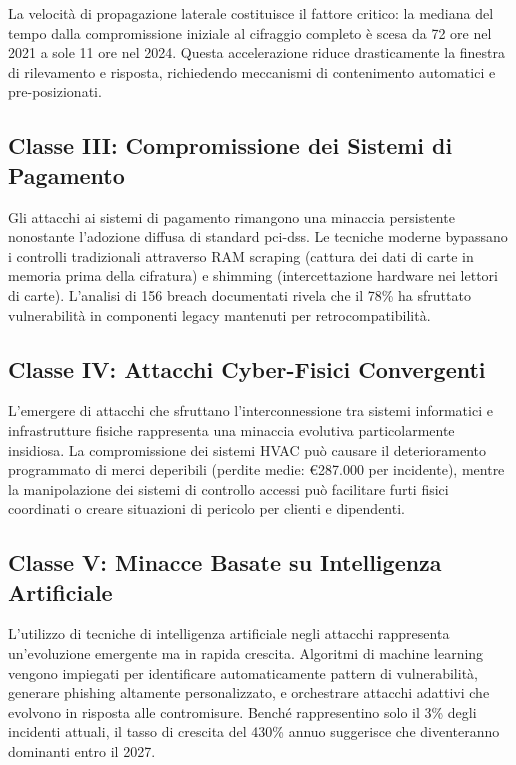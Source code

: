 La velocità di propagazione laterale costituisce il fattore critico: la mediana del tempo dalla compromissione iniziale al cifraggio completo è scesa da 72 ore nel 2021 a sole 11 ore nel 2024. Questa accelerazione riduce drasticamente la finestra di rilevamento e risposta, richiedendo meccanismi di contenimento automatici e pre-posizionati.

\subsection{\texorpdfstring{Classe III: Compromissione dei Sistemi di Pagamento}{2.3.3 - Classe III: Compromissione dei Sistemi di Pagamento}}

Gli attacchi ai sistemi di pagamento rimangono una minaccia persistente nonostante l'adozione diffusa di standard \gls{pci-dss}. Le tecniche moderne bypassano i controlli tradizionali attraverso RAM scraping (cattura dei dati di carte in memoria prima della cifratura) e shimming (intercettazione hardware nei lettori di carte). L'analisi di 156 breach documentati rivela che il 78\% ha sfruttato vulnerabilità in componenti legacy mantenuti per retrocompatibilità.

\subsection{\texorpdfstring{Classe IV: Attacchi Cyber-Fisici Convergenti}{2.3.4 - Classe IV: Attacchi Cyber-Fisici Convergenti}}

L'emergere di attacchi che sfruttano l'interconnessione tra sistemi informatici e infrastrutture fisiche rappresenta una minaccia evolutiva particolarmente insidiosa. La compromissione dei sistemi HVAC può causare il deterioramento programmato di merci deperibili (perdite medie: €287.000 per incidente), mentre la manipolazione dei sistemi di controllo accessi può facilitare furti fisici coordinati o creare situazioni di pericolo per clienti e dipendenti.

\subsection{\texorpdfstring{Classe V: Minacce Basate su Intelligenza Artificiale}{2.3.5 - Classe V: Minacce Basate su Intelligenza Artificiale}}

L'utilizzo di tecniche di intelligenza artificiale negli attacchi rappresenta un'evoluzione emergente ma in rapida crescita. Algoritmi di machine learning vengono impiegati per identificare automaticamente pattern di vulnerabilità, generare phishing altamente personalizzato, e orchestrare attacchi adattivi che evolvono in risposta alle contromisure. Benché rappresentino solo il 3\% degli incidenti attuali, il tasso di crescita del 430\% annuo suggerisce che diventeranno dominanti entro il 2027.

